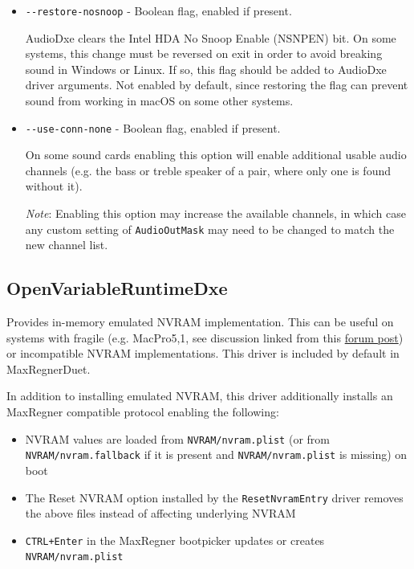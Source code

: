 \documentclass[]{article}
\providecommand{\tightlist}{%
  \setlength{\itemsep}{0pt}\setlength{\parskip}{0pt}}
\begin{document}
\begin{itemize}
  \texttt{HDA: GPIO setup on pins 0x0F - Success} \medskip

  Values for driver parameters can be specified in hexadecimal beginning with \texttt{0x} or
  in decimal, e.g. \texttt{-{}-gpio-pins=0x12} or \texttt{-{}-gpio-pins=18}. \medskip

  \item \texttt{-{}-restore-nosnoop} - Boolean flag, enabled if present. \medskip

  AudioDxe clears the Intel HDA No Snoop Enable (NSNPEN) bit. On some systems, this change must
  be reversed on exit in order to avoid breaking sound in Windows or Linux. If so, this flag should
  be added to AudioDxe driver arguments.
  Not enabled by default, since restoring the flag can prevent sound from working in macOS on
  some other systems. \medskip

  \item \texttt{-{}-use-conn-none} - Boolean flag, enabled if present. \medskip

  On some sound cards enabling this option will enable additional usable audio channels (e.g.
  the bass or treble speaker of a pair, where only one is found without it).
  \medskip

  \emph{Note}: Enabling this option may increase the available channels, in which case any
  custom setting of \texttt{AudioOutMask} may need to be changed to match the new channel list.
  \medskip
\end{itemize}

\subsection{OpenVariableRuntimeDxe}\label{emunvram}

Provides in-memory emulated NVRAM implementation. This can be useful on systems with fragile
(e.g. MacPro5,1, see discussion linked from this \href{https://forums.macrumors.com/posts/30945127}{forum post})
or incompatible NVRAM implementations. This driver is included by default in MaxRegnerDuet.

In addition to installing emulated NVRAM, this driver additionally installs an MaxRegner compatible
protocol enabling the following:

\begin{itemize}
\tightlist
  \item NVRAM values are loaded from \texttt{NVRAM/nvram.plist} (or from \texttt{NVRAM/nvram.fallback}
  if it is present and \texttt{NVRAM/nvram.plist} is missing) on boot
  \item The Reset NVRAM option installed by the \texttt{ResetNvramEntry} driver removes the above files instead
  of affecting underlying NVRAM
  \item \texttt{CTRL+Enter} in the MaxRegner bootpicker updates or creates \texttt{NVRAM/nvram.plist}
\end{itemize}
\end{document}
